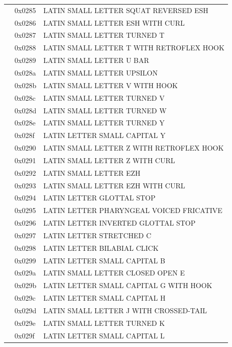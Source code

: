 \documentclass[12pt, twoside]{article}
\begin{document}
\begin{longtable}{L{1.0cm} L{2.0cm} >{\footnotesize}L{10cm}}
&0x0285&LATIN SMALL LETTER SQUAT REVERSED ESH\\
&0x0286&LATIN SMALL LETTER ESH WITH CURL\\
&0x0287&LATIN SMALL LETTER TURNED T\\
&0x0288&LATIN SMALL LETTER T WITH RETROFLEX HOOK\\
&0x0289&LATIN SMALL LETTER U BAR\\
&0x028a&LATIN SMALL LETTER UPSILON\\
&0x028b&LATIN SMALL LETTER V WITH HOOK\\
&0x028c&LATIN SMALL LETTER TURNED V\\
&0x028d&LATIN SMALL LETTER TURNED W\\
&0x028e&LATIN SMALL LETTER TURNED Y\\
&0x028f&LATIN LETTER SMALL CAPITAL Y\\
&0x0290&LATIN SMALL LETTER Z WITH RETROFLEX HOOK\\
&0x0291&LATIN SMALL LETTER Z WITH CURL\\
&0x0292&LATIN SMALL LETTER EZH\\
&0x0293&LATIN SMALL LETTER EZH WITH CURL\\
&0x0294&LATIN LETTER GLOTTAL STOP\\
&0x0295&LATIN LETTER PHARYNGEAL VOICED FRICATIVE\\
&0x0296&LATIN LETTER INVERTED GLOTTAL STOP\\
&0x0297&LATIN LETTER STRETCHED C\\
&0x0298&LATIN LETTER BILABIAL CLICK\\
&0x0299&LATIN LETTER SMALL CAPITAL B\\
&0x029a&LATIN SMALL LETTER CLOSED OPEN E\\
&0x029b&LATIN LETTER SMALL CAPITAL G WITH HOOK\\
&0x029c&LATIN LETTER SMALL CAPITAL H\\
&0x029d&LATIN SMALL LETTER J WITH CROSSED-TAIL\\
&0x029e&LATIN SMALL LETTER TURNED K\\
&0x029f&LATIN LETTER SMALL CAPITAL L\\

\end{longtable}
\end{document}
